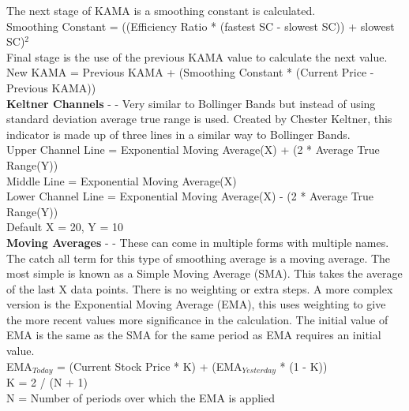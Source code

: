 \documentclass[conference]{IEEEtran}
\begin{document}
\noindent
The next stage of KAMA is a smoothing constant is calculated. \\

\noindent
Smoothing Constant = ((Efficiency Ratio * (fastest SC - slowest SC)) + slowest SC)$^2$\\

\noindent
Final stage is the use of the previous KAMA value to calculate the next value. \\

\noindent
New KAMA = Previous KAMA + (Smoothing Constant * (Current Price - Previous KAMA))\\

\noindent
\textbf{Keltner Channels} - \cite{Keltner1960} - Very similar to Bollinger Bands but instead of using standard deviation average true range is used. Created by Chester Keltner, this indicator is made up of three lines in a similar way to Bollinger Bands.\\

\noindent
Upper Channel Line = Exponential Moving Average(X) + (2 * Average True Range(Y))\\
Middle Line = Exponential Moving Average(X)\\
Lower Channel Line = Exponential Moving Average(X) - (2 * Average True Range(Y))\\ Default X = 20, Y = 10 \\

\noindent
\textbf{Moving Averages} - \cite{Murphy1999} - These can come in multiple forms with multiple names. The catch all term for this type of smoothing average is a moving average. The most simple is known as a Simple Moving Average (SMA). This takes the average of the last X data points. There is no weighting or extra steps. A more complex version is the Exponential Moving Average (EMA), this uses weighting to give the more recent values more significance in the calculation. The initial value of EMA is the same as the SMA for the same period as EMA requires an initial value.\\

\noindent
EMA$_{Today}$ = (Current Stock Price * K) + (EMA$_{Yesterday}$ * (1 - K)) \\
K = 2 / (N + 1) \\
N = Number of periods over which the EMA is applied \\

\end{document}
